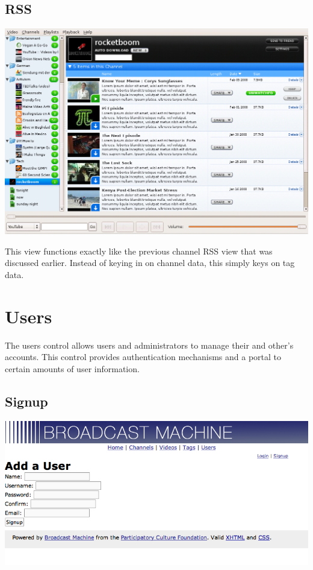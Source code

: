 \documentclass[a4paper,12pt]{report}
\begin{document}
\subsection{RSS}
\includegraphics[width=150mm]{images/channelrss.png}

This view functions exactly like the previous channel RSS view that was discussed earlier.
Instead of keying in on channel data, this simply keys on tag data.

\section{Users}
The users control allows users and administrators to manage their and other's accounts.
This control provides authentication mechanisms and a portal to certain amounts of user information.

\subsection{Signup}
\includegraphics[width=150mm]{images/usersignup.png}
\end{document}
